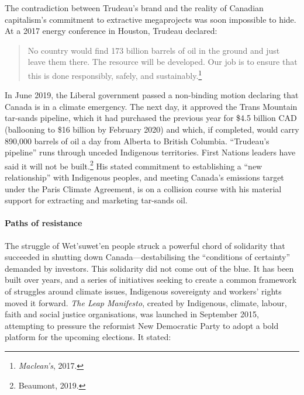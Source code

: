 The contradiction between Trudeau's brand and the reality of Canadian capitalism's commitment to extractive megaprojects was soon impossible to hide. At a 2017 energy conference in Houston, Trudeau declared:

\blockquote{No country would find 173 billion barrels of oil in the ground and just leave them there. The resource will be developed. Our job is to ensure that this is done responsibly, safely, and sustainably.\footnote{\emph{Maclean's}, 2017.}}

In June 2019, the Liberal government passed a non-binding motion declaring that Canada is in a climate emergency. The next day, it approved the Trans Mountain tar-sands pipeline, which it had purchased the previous year for \$4.5 billion CAD (ballooning to \$16 billion by February 2020) and which, if completed, would carry 890,000 barrels of oil a day from Alberta to British Columbia. ``Trudeau's pipeline'' runs through unceded Indigenous territories. First Nations leaders have said it will not be built.\footnote{Beaumont, 2019.} His stated commitment to establishing a ``new relationship'' with Indigenous peoples, and meeting Canada's emissions target under the Paris Climate Agreement, is on a collision course with his material support for extracting and marketing tar-sands oil.

\paragraph{Paths of resistance}

The struggle of Wet'suwet'en people struck a powerful chord of solidarity that succeeded in shutting down Canada---destabilising the ``conditions of certainty'' demanded by investors. This solidarity did not come out of the blue. It has been built over years, and a series of initiatives seeking to create a common framework of struggles around climate issues, Indigenous sovereignty and workers' rights moved it forward. \emph{The Leap Manifesto}, created by Indigenous, climate, labour, faith and social justice organisations, was launched in September 2015, attempting to pressure the reformist New Democratic Party to adopt a bold platform for the upcoming elections. It stated:


